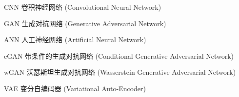 \begin{denotation}[3cm]
\item[CNN] 卷积神经网络 (Convolutional Neural Network)
\item[GAN] 生成对抗网络 (Generative Adversarial Network)
\item[ANN] 人工神经网络 (Artificial Neural Network)
\item[cGAN] 带条件的生成对抗网络 (Conditional Generative Adversarial Network)
\item[wGAN] 沃瑟斯坦生成对抗网络 (Wasserstein Generative Adversarial Network)
\item[VAE] 变分自编码器 (Variational Auto-Encoder)
\end{denotation}

